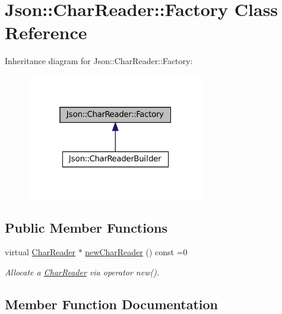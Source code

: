 \hypertarget{classJson_1_1CharReader_1_1Factory}{}\section{Json\+:\+:Char\+Reader\+:\+:Factory Class Reference}
\label{classJson_1_1CharReader_1_1Factory}


Inheritance diagram for Json\+:\+:Char\+Reader\+:\+:Factory\+:
\nopagebreak
\begin{figure}[H]
\begin{center}
\leavevmode
\includegraphics[width=220pt]{classJson_1_1CharReader_1_1Factory__inherit__graph}
\end{center}
\end{figure}
\subsection*{Public Member Functions}
\begin{DoxyCompactItemize}
\item 
virtual \hyperlink{classJson_1_1CharReader}{Char\+Reader} $\ast$ \hyperlink{classJson_1_1CharReader_1_1Factory_a4c5862a1ffd432372dbe65cf59de98c4}{new\+Char\+Reader} () const =0
\begin{DoxyCompactList}\small\item\em Allocate a \hyperlink{classJson_1_1CharReader}{Char\+Reader} via operator new(). \end{DoxyCompactList}\end{DoxyCompactItemize}


\subsection{Member Function Documentation}
\mbox{\label{classJson_1_1CharReader_1_1Factory_a4c5862a1ffd432372dbe65cf59de98c4}} 
